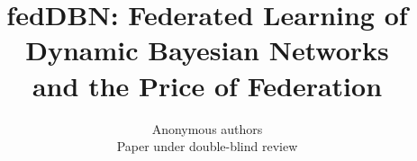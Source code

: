 \documentclass[10pt]{article}
\title{fedDBN: Federated Learning of Dynamic Bayesian Networks\\and the Price of Federation}
\author{\name Anonymous authors \\ \addr Paper under double-blind review}
\begin{document}
\maketitle

\begin{abstract}

\end{abstract}












\appendix
{}

\end{document}
